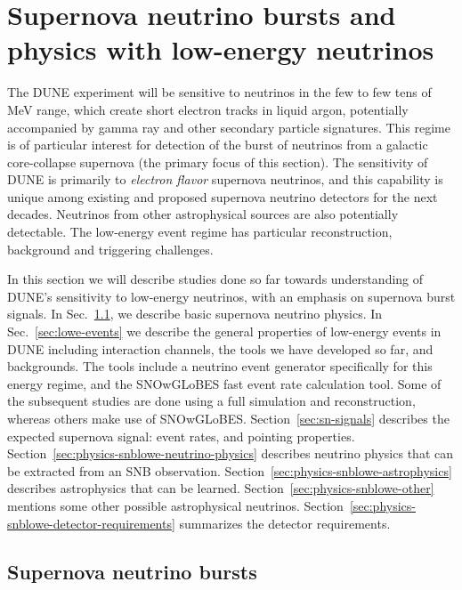 \chapter{Supernova neutrino bursts and physics with low-energy neutrinos}
\label{ch:snb-lowe}


The DUNE experiment will be sensitive to neutrinos in the few to few
tens of MeV range, which create short electron tracks in liquid argon, potentially accompanied by
gamma ray and other secondary particle signatures.   
This regime is of
particular interest for detection of the burst of neutrinos from a galactic
core-collapse supernova (the primary focus of this section). 
The sensitivity of DUNE is primarily to \textit{electron flavor} supernova neutrinos, and this capability is unique among existing and proposed supernova neutrino detectors for the next decades.  
Neutrinos from other astrophysical sources are also potentially detectable.  
The low-energy event regime has particular reconstruction, background and triggering challenges.

In this section we will describe studies done so far towards
understanding of DUNE's sensitivity to low-energy neutrinos, with an
emphasis on supernova burst signals.   In Sec.~\ref{sec:snb-lowe-snb},
we describe basic supernova neutrino physics.  In
Sec.~\ref{sec:lowe-events} we describe the general properties of
low-energy events in DUNE including interaction channels, the tools we
have developed so far, and backgrounds.  The tools include a neutrino event generator
specifically for this energy regime, and the SNOwGLoBES fast event
rate calculation tool.  Some of the subsequent studies are done using
a full simulation and reconstruction, whereas others make use of
SNOwGLoBES.
Section~\ref{sec:sn-signals} describes the
expected supernova signal: event rates, and pointing properties.
Section~\ref{sec:physics-snblowe-neutrino-physics} describes neutrino
physics that can be extracted from an SNB observation.
Section~\ref{sec:physics-snblowe-astrophysics} describes astrophysics
that can be learned.  Section~\ref{sec:physics-snblowe-other} mentions
some other possible astrophysical neutrinos.
Section~\ref{sec:physics-snblowe-detector-requirements} summarizes the
detector requirements.


\section{Supernova neutrino bursts}
\label{sec:snb-lowe-snb}




